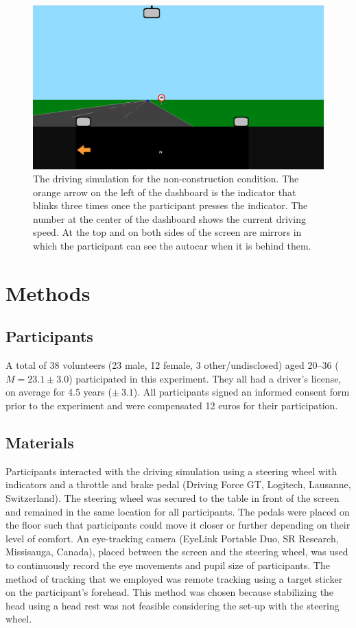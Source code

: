\renewcommand{\thefigure}{2.1}
\begin{figure}
  \centering
  \includegraphics[width=\textwidth]{images/screenshot_noncon_blinker.pdf}
  \caption{The driving simulation for the non-construction condition.
  The orange arrow on the left of the dashboard is the indicator that blinks three times once the participant presses the indicator.
  The number at the center of the dashboard shows the current driving speed. 
  At the top and on both sides of the screen are mirrors in which the participant can see the autocar when it is behind them.}
  \label{fig:screenshot_noncon}
\end{figure}

\section{Methods}\label{sec:methods}
\subsection{Participants}
A total of 38 volunteers (23 male, 12 female, 3 other/undisclosed) aged 20--36 (\(M = 23.1 \pm 3.0\)) participated in this experiment. 
They all had a driver's license, on average for 4.5 years (\(\pm\ 3.1\)).
All participants signed an informed consent form prior to the experiment and were compensated 12 euros for their participation.

\subsection{Materials}
Participants interacted with the driving simulation using a steering wheel with indicators and a throttle and brake pedal (Driving Force GT, Logitech, Lausanne, Switzerland). 
The steering wheel was secured to the table in front of the screen and remained in the same location for all participants. 
The pedals were placed on the floor such that participants could move it closer or further depending on their level of comfort. 
An eye-tracking camera (EyeLink Portable Duo, SR Research, Missisauga, Canada), placed between the screen and the steering wheel, was used to continuously record the eye movements and pupil size of participants. 
The method of tracking that we employed was remote tracking using a target sticker on the participant's forehead.
This method was chosen because stabilizing the head using a head rest was not feasible considering the set-up with the steering wheel.

